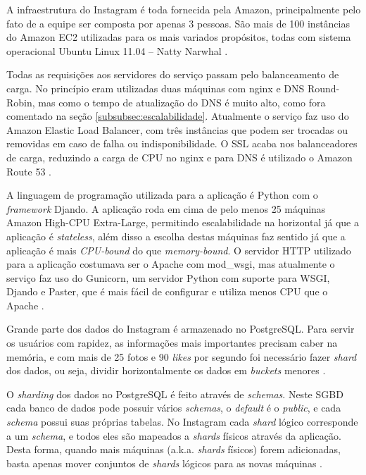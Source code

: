 \documentclass[diss]{template/setrem}
\begin{document}
A infraestrutura do Instagram é toda fornecida pela Amazon, principalmente pelo fato de a equipe ser composta por apenas 3 pessoas. São mais de 100 instâncias do Amazon EC2 utilizadas para os mais variados propósitos, todas com sistema operacional Ubuntu Linux 11.04 -- Natty Narwhal \citep{Instagram2011}.

Todas as requisições aos servidores do serviço passam pelo balanceamento de carga. No princípio eram utilizadas duas máquinas com nginx e DNS Round-Robin, mas como o tempo de atualização do DNS é muito alto, como fora comentado na seção \ref{subsubsec:escalabilidade}. Atualmente o serviço faz uso do Amazon Elastic Load Balancer, com três instâncias que podem ser trocadas ou removidas em caso de falha ou indisponibilidade. O SSL acaba nos balanceadores de carga, reduzindo a carga de CPU no nginx e para DNS é utilizado o Amazon Route 53 \citep{Instagram2011}.

A linguagem de programação utilizada para a aplicação é Python com o \emph{framework} Djando. A aplicação roda em cima de pelo menos 25 máquinas Amazon High-CPU Extra-Large, permitindo escalabilidade na horizontal já que a aplicação é \emph{stateless}, além disso a escolha destas máquinas faz sentido já que a aplicação é mais \emph{CPU-bound} do que \emph{memory-bound}. O servidor HTTP utilizado para a aplicação costumava ser o Apache com mod\_wsgi, mas atualmente o serviço faz uso do Gunicorn, um servidor Python com suporte para WSGI, Djando e Paster, que é mais fácil de configurar e utiliza menos CPU que o Apache \citep{Instagram2011}.

Grande parte dos dados do Instagram é armazenado no PostgreSQL. Para servir os usuários com rapidez, as informações mais importantes precisam caber na memória, e com mais de 25 fotos e 90 \emph{likes} por segundo foi necessário fazer \emph{shard} dos dados, ou seja, dividir horizontalmente os dados em \emph{buckets} menores \citep{Instagram2011a}.

O \emph{sharding} dos dados no PostgreSQL é feito através de \emph{schemas}. Neste SGBD cada banco de dados pode possuir vários \emph{schemas}, o \emph{default} é o \emph{public}, e cada \emph{schema} possui suas próprias tabelas. No Instagram cada \emph{shard} lógico corresponde a um \emph{schema}, e todos eles são mapeados a \emph{shards} físicos através da aplicação. Desta forma, quando mais máquinas (a.k.a. \emph{shards} físicos) forem adicionadas, basta apenas mover conjuntos de \emph{shards} lógicos para as novas máquinas \citep{Instagram2011a}.
\end{document}
